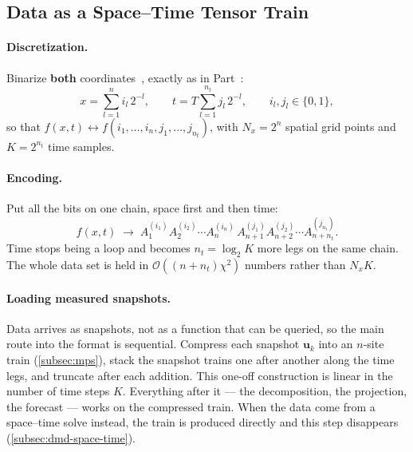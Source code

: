 \subsection{Data as a Space--Time Tensor Train}
\label{subsec:space-time-data}

\paragraph{Discretization.}
Binarize \textbf{both} coordinates~\cite{Peddinti2025a}, exactly as in
Part~:
\begin{equation}
  x = \sum_{l=1}^{n} i_l\, 2^{-l}, \qquad
  t = T \sum_{l=1}^{n_t} j_l\, 2^{-l}, \qquad
  i_l, j_l \in \{0,1\},
  \label{eq:space-time-bits}
\end{equation}%
so that $f(x,t) \longleftrightarrow f(i_1,\dots,i_n,j_1,\dots,j_{n_t})$, with
$N_x = 2^n$ spatial grid points and $K = 2^{n_t}$ time samples.

\paragraph{Encoding.}
Put all the bits on one chain, space first and then time:
\begin{equation}
  f(x,t) \;\to\; A_1^{(i_1)} A_2^{(i_2)} \cdots A_n^{(i_n)}\,
  A_{n+1}^{(j_1)} A_{n+2}^{(j_2)} \cdots A_{n+n_t}^{(j_{n_t})} .
  \label{eq:space-time-mps}
\end{equation}%
Time stops being a loop and becomes $n_t = \log_2 K$ more legs on the same
chain. The whole data set is held in $\mathcal O((n+n_t)\chi^2)$ numbers rather
than $N_x K$.

\paragraph{Loading measured snapshots.}
Data arrives as snapshots, not as a function that can be queried, so the main
route into the format is sequential. Compress each snapshot $\mathbf u_k$ into
an $n$-site train (\cref{subsec:mps}), stack the snapshot trains one after
another along the time legs, and truncate after each addition. This one-off
construction is linear in the number of time steps $K$. Everything after it ---
the decomposition, the projection, the forecast --- works on the compressed
train. When the data come from a space--time solve instead, the train is
produced directly and this step disappears (\cref{subsec:dmd-space-time}).

